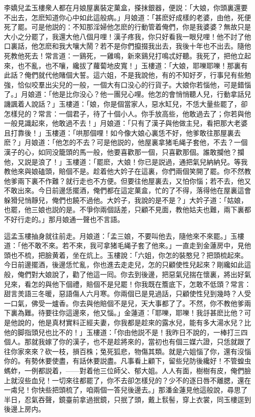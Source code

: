 李嬌兒孟玉樓衆人都在月娘屋裏裝定菓盒，搽抹銀器，便説：「大娘，你頭裏還要不出去，怎麽知道你心中如此這般病。」月娘道：「甚麽好成樣的老婆，由他，死便死了罷。可是他説的：不知那淫婦他怎麽的行動管着俺們，你是我婆婆？無故只是大小之分罷了，我還大他八個月哩！漢子疼我，你只好看我一眼兒哩！他不討了他口裏話，他怎麽和我大嚷大鬧？若不是你們攛掇我出去，我後十年也不出去。隨他死教他死去！常言道：一鷄死，一雞鳴，新來鷄兒打鳴忒好聽。我死了，把他立起來，也不亂，也不嚷，纔拔了蘿蔔地皮寬！」玉樓道：「大娘，耶嚛耶嚛！那裏有此話？俺們就代他賭個大誓。這六姐，不是我說他，有的不知好歹，行事兒有些勉強，恰似咬羣出尖兒的一般，一個大有口没心的行貨子。大娘你若惱他，可是錯惱了。」月娘道：「他是比你没心？他一團兒心哩。他怎的會悄悄聽人兒，行動拿話兒譏諷着人說話？」玉樓道：「娘，你是個當家人，惡水缸兒，不恁大量些罷了，卻怎樣兒的？常言：一個君子，待了十個小人。你手放高些，他敢過去了；你若與他一般見識起來，他敢過不去！」月娘道：「只有了漢子與他做主兒，看把那大老婆且打靠後！」玉樓道：「哄那個哩！如今像大娘心裏恁不好，他爹敢往那屋裏去麽？」月娘道：「他怎的不去？可是他説的，他屋裏拿猪毛䋲子套他，不去？一個漢子的心，如同没籠頭的馬一般，他要喜歡那一個，只喜歡那個。誰敢攔他？攔他，又説是浪了！」玉樓道：「罷麽，大娘！你已是説過，通把氣兒納納兒。等我教他來與娘磕頭，賠個不是。趁着他大妗子在這裏，你們兩個笑開了罷。你不然教他爹兩下裏不作難？就行走也不方便。但要往他屋裏去，又怕你惱；若不去，他又不敢出來。今日前邊恁擺酒，俺們都在這定菓盒，忙的了不得，落得他在屋裏這會躲猾兒悄靜兒，俺們也饒不過他。大妗子，我說的是不是？」大妗子道：「姑娘，也罷，他三娘也説的是。不爭你兩個話差，只顧不見面，教他姑夫也難，兩下裏都不好行走的。」那月娘通一聲也不言語。

這孟玉樓抽身就往前走。月娘道：「孟三娘，不要叫他去，隨他來不來罷。」玉樓道：「他不敢不來。若不來，我可拿猪毛䋲子套了他來。」一直走到金蓮房中，見他頭也不梳，把臉黄着，坐在炕上。玉樓說：「六姐，你怎的裝憨兒？把頭梳起來。今日前邊擺酒，後邊恁忙亂，你也進去走走兒，怎的只顧使性兒起來？剛纔如此這般，俺們對大娘說了，勸了他這一囘。你去到後邊，把惡氣兒揣在懷裏，將出好氣兒來，看怎的與他下個禮，賠個不是兒罷！你我既在簷底下，怎敢不低頭？常言：甜言羙語三冬暖，惡語傷人六月寒。你兩個已是見過話，只顧使性兒到幾時？人受一口氣，佛受一爐香。你去與他賠個不是兒，天大事都了了。不然，你不教他爹兩下裏為難。待要往你這邊來，他又惱。」金蓮道：「耶嚛，耶嚛！我㧱甚麽比他？可是他說的，他是真材實料正經夫妻，你我都是趁來的露水兒，能有多大湯水兒？比他的脚指頭兒也比不的！」玉樓道：「你由他説不是！我昨日不說的，一棒打三四個人。那就我嫁了你的漢子，也不是趁將來的，當初也有個三媒六證，只恁就跟了往你家來來？砍一枝，損百株；兔死狐悲，物傷其類。就是六姐惱了你，還有沒惱你的。有勢休要使盡，有話休要説盡。凡事看上顧下，留些兒防後纔好！不管蝗虫螞蚱，一例都説着，——對着他三位師父、郁大姐。人人有面，樹樹有皮，俺們臉上就沒些血兒！一切來往都罷了，你不去卻怎樣兒的？少不的逐日唇不離腮，還在一䖏兒！你快些把頭梳了，咱兩個一答兒後邊去。」那潘金蓮見他這般說，尋思了半日，忍氣吞聲，鏡臺前拿過抿鏡，只抿了頭，戴上䯼髻，穿上衣裳，同玉樓逕到後邊上房内。


